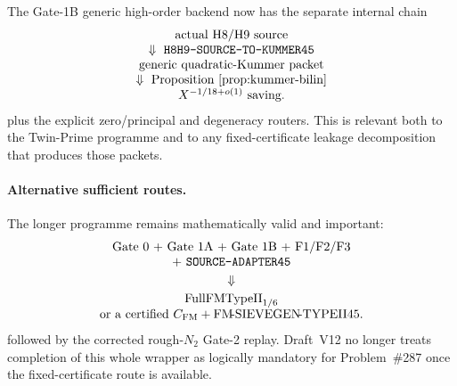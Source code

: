 \documentclass[11pt]{article}
\theoremstyle{definition}
\theoremstyle{remark}
\newcommand{\FullFM}{\mathrm{FullFMTypeII}_{1/6}}
\newcommand{\1}{\mathbf 1}
\begin{document}
\begin{center}
\end{center}

The Gate-1B generic high-order backend now has the separate internal chain
\[
\begin{array}{c}
 \text{actual H8/H9 source}\\
 \Downarrow\ \texttt{H8H9-SOURCE-TO-KUMMER45}\\
 \text{generic quadratic-Kummer packet}\\
 \Downarrow\ \text{Proposition~\ref{prop:kummer-bilin}}\\
 X^{-1/18+o(1)}\text{ saving}.
\end{array}
\]
plus the explicit zero/principal and degeneracy routers.  This is relevant both to the Twin-Prime programme and
to any fixed-certificate leakage decomposition that produces those packets.

\paragraph{Alternative sufficient routes.}
The longer programme remains mathematically valid and important:
\[
\begin{array}{c}
 \text{Gate 0 + Gate 1A + Gate 1B + F1/F2/F3}\\
 +\ \texttt{SOURCE-ADAPTER45}\\[1mm]
 \Downarrow\\[1mm]
 \FullFM\\
 \text{or a certified }C_{\rm FM}+\mathrm{FM\!\mbox{-}SIEVEGEN\!\mbox{-}TYPEII45}.
\end{array}
\]
followed by the corrected rough-$N_2$ Gate-2 replay.  Draft~V12 no longer treats completion of this whole
wrapper as logically mandatory for Problem~\#287 once the fixed-certificate route is available.
\end{document}
